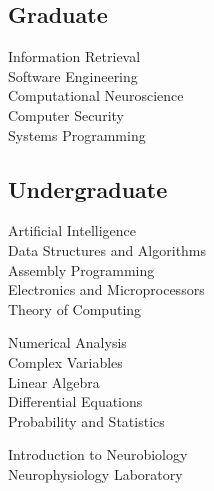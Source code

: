 \documentclass[letterpaper]{deedy-resume} %
\begin{document}
\begin{minipage}[t]{0.33\textwidth}
\subsection{Graduate}

Information Retrieval\\
Software Engineering \\
Computational Neuroscience \\
Computer Security \\
Systems Programming \\

\sectionspace %


\subsection{Undergraduate}

Artificial Intelligence \\
Data Structures and Algorithms \\
Assembly Programming \\
Electronics and Microprocessors \\
Theory of Computing \\

\vspace{1mm}

Numerical Analysis \\
Complex Variables \\
Linear Algebra \\
Differential Equations \\
Probability and Statistics \\

\vspace{1mm}

Introduction to Neurobiology \\
Neurophysiology Laboratory \\

\sectionspace %


\end{minipage} %
\hfill
%
\end{document}
